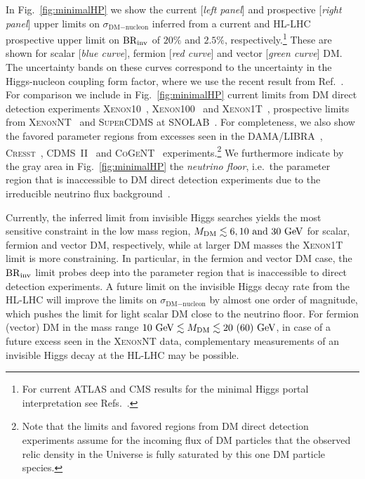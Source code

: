 \documentclass[../report.tex]{subfiles}
\begin{document}
In Fig.~\ref{fig:minimalHP} we show the current [\emph{left panel}] and prospective [\emph{right panel}] upper limits on $\sigma_{\text{DM}-\text{nucleon}}$ inferred from a current and HL-LHC prospective upper limit on $\mathrm{BR}_\mathrm{inv}$ of $20\%$ and $2.5\%$, respectively.\footnote{For current  ATLAS and CMS results for the minimal Higgs portal interpretation see Refs.~\cite{Aad:2015pla,Khachatryan:2016whc,Aaboud:2018sfi,Sirunyan:2018owy}.} These are shown for scalar [\emph{blue curve}], fermion [\emph{red curve}]  and vector [\emph{green curve}] DM. The uncertainty bands on these curves correspond to the uncertainty in the Higgs-nucleon coupling form factor, where we use the recent result from Ref.~\cite{Hoferichter:2017olk}. For comparison we include in Fig.~\ref{fig:minimalHP} current limits from DM direct detection experiments \textsc{Xenon10}~\cite{Angle:2011th}, \textsc{Xenon100}~\cite{Aprile:2012nq} and \textsc{Xenon1T}~\cite{Aprile:2018dbl}, prospective limits from \textsc{XenonNT}~\cite{Aprile:2015uzo} and \textsc{SuperCDMS} at SNOLAB~\cite{Agnese:2016cpb}. For completeness, we also show the favored parameter regions from excesses seen in the \textsc{DAMA/LIBRA}~\cite{Savage:2008er}, \textsc{Cresst}~\cite{Angloher:2011uu}, \textsc{CDMS~II}~\cite{Agnese:2013rvf} and \textsc{CoGeNT}~\cite{Aalseth:2012if} experiments.\footnote{Note that the limits and favored regions from DM direct detection experiments assume for the incoming flux of DM particles that the observed relic density in the Universe is fully saturated by this one DM particle species.} We furthermore indicate by the gray area in Fig.~\ref{fig:minimalHP} the \emph{neutrino floor}, i.e.~the parameter region that is inaccessible to DM direct detection experiments due to the irreducible neutrino flux background~\cite{Billard:2013qya}.

Currently, the inferred limit from invisible Higgs searches yields the most sensitive constraint in the low mass region, $M_\text{DM} \lesssim 6, 10~\mbox{and}~30~\text{GeV}$ for scalar, fermion and vector DM, respectively, while at larger DM masses the \textsc{Xenon1T} limit is more constraining. In particular, in the fermion and vector DM case, the $\mathrm{BR}_\mathrm{inv}$ limit probes deep into the parameter region that is inaccessible to direct detection experiments. A future limit on the invisible Higgs decay rate from the HL-LHC will improve the limits on $\sigma_{\text{DM}-\text{nucleon}}$ by almost one order of magnitude, which pushes the limit for light scalar DM close to the neutrino floor. For fermion (vector) DM in the mass range $10~\text{GeV} \lesssim M_{\text{DM}} \lesssim 20~(60)~\text{GeV}$, in case of a future excess seen in the \textsc{XenonNT} data, complementary measurements of an invisible Higgs decay at the HL-LHC may be possible. 
\end{document}
